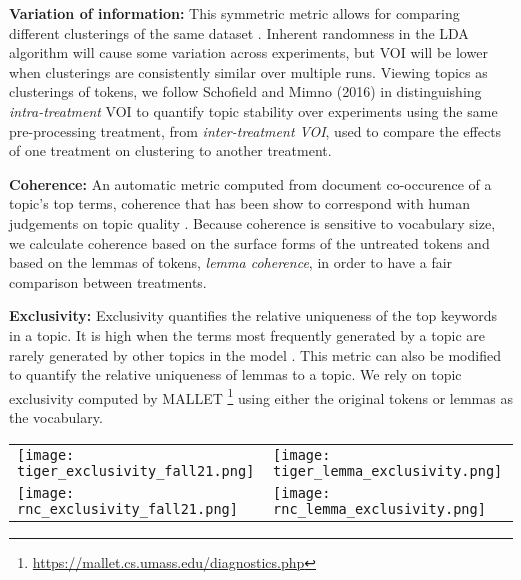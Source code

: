 \documentclass[11pt,a4paper]{article}
\begin{document}
\textbf{Variation of information:} This symmetric metric allows for comparing different clusterings of the same dataset \cite{Meila2003ComparingCB}. Inherent randomness in the LDA algorithm will cause some variation across experiments, but VOI will be lower when clusterings are consistently similar over multiple runs. Viewing topics as clusterings of tokens, we follow Schofield and Mimno (2016) in distinguishing \textit{intra-treatment} VOI to quantify topic stability over experiments using the same pre-processing treatment,  from \textit{inter-treatment VOI}, used to compare the effects of one treatment on clustering to another treatment.

\textbf{Coherence:} An automatic metric computed from document co-occurence of a topic's top terms, coherence that has been show to correspond with human judgements on topic quality \cite{mimno2011optimizing}. Because coherence is sensitive to vocabulary size, we calculate coherence based on the surface forms of the untreated tokens \cite{schofield-mimno-2016-comparing} and based on the lemmas of tokens, \textit{lemma coherence}, in order to have a fair comparison between treatments.

\textbf{Exclusivity:} Exclusivity quantifies the relative uniqueness of the top keywords in a topic. It is high when the terms most frequently generated by a topic are rarely generated by other topics in the model \cite{bischof2012exclusivity}. This metric can also be modified to quantify the relative uniqueness of lemmas to a topic. We rely on topic exclusivity computed by MALLET \footnote{\url{https://mallet.cs.umass.edu/diagnostics.php}} using either the original tokens or lemmas as the vocabulary.

\begin{figure*}[t]
    \label{fig:exclusivity}
    \begin{tabular}{ll}
        \texttt{[image: tiger\_exclusivity\_fall21.png]} & \texttt{[image: tiger\_lemma\_exclusivity.png]} \\
        \texttt{[image: rnc\_exclusivity\_fall21.png]} &
        \texttt{[image: rnc\_lemma\_exclusivity.png]}
    \end{tabular}
\end{figure*}
\end{document}
